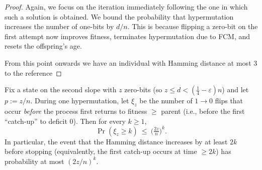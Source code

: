\documentclass[lettersize,journal]{IEEEtran}
\begin{document}
\begin{proof}
Again, we focus on the iteration immediately following the one in which such a solution is obtained. We bound the probability that hypermutation increases the number of one-bits by $d/n$. This is because flipping a zero-bit on the first attempt now improves fitness, terminates hypermutation due to FCM, and resets the offspring's age.

From this point onwards we have an individual with Hamming distance at most 3 to the reference

\end{proof}

\begin{lemma}\label{lem:xi-tail}
	Fix a state on the second slope with $z$ zero-bits (so $z\le d<(\tfrac14-\varepsilon)n$) and let $p:=z/n$.
	During one hypermutation, let $\xi_z$ be the number of $1\!\to 0$ flips that occur \emph{before} the process first returns to fitness $\ge$ parent (i.e., before the first ``catch-up'' to deficit $0$). Then for every $k\ge 1$,
	\[
	\Pr(\xi_z\ge k)\ \le\ \Big(\tfrac{2z}{n}\Big)^k.
	\]
	In particular, the event that the Hamming distance increases by at least $2k$ before stopping (equivalently, the first catch-up occurs at time $\ge 2k$) has probability at most $(2z/n)^k$.
\end{lemma}
\end{document}
